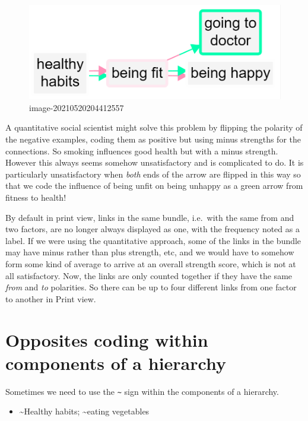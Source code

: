 \documentclass[
]{book}
\providecommand{\tightlist}{%
  \setlength{\itemsep}{0pt}\setlength{\parskip}{0pt}}
\begin{document}
\begin{figure}
\centering
\includegraphics[width=6.77083in,height=\textheight]{_assets/image-20210520204412557.png}
\caption{image-20210520204412557}
\end{figure}

A quantitative social scientist might solve this problem by flipping the polarity of the negative examples, coding them as positive but using minus strengths for the connections. So smoking influences good health but with a minus strength. However this always seems somehow unsatisfactory and is complicated to do. It is particularly unsatisfactory when \emph{both} ends of the arrow are flipped in this way so that we code the influence of being unfit on being unhappy as a green arrow from fitness to health!

By default in print view, links in the same bundle, i.e.~with the same from and two factors, are no longer always displayed as one, with the frequency noted as a label. If we were using the quantitative approach, some of the links in the bundle may have minus rather than plus strength, etc, and we would have to somehow form some kind of average to arrive at an overall strength score, which is not at all satisfactory. Now, the links are only counted together if they have the same \emph{from} and \emph{to} polarities. So there can be up to four different links from one factor to another in Print view.

\hypertarget{opposites-coding-within-components-of-a-hierarchy}{%
\section{Opposites coding within components of a hierarchy}\label{opposites-coding-within-components-of-a-hierarchy}}

Sometimes we need to use the \texttt{\textasciitilde{}} sign within the components of a hierarchy.

\begin{itemize}
\tightlist
\item
  \textasciitilde Healthy habits; \textasciitilde eating vegetables
\end{itemize}
\end{document}
